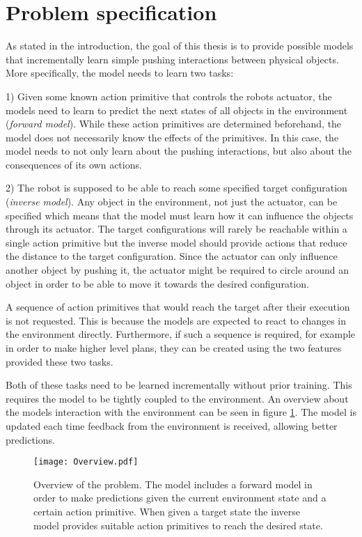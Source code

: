 \section{Problem specification \label{sec:problem}}

As stated in the introduction, the goal of this thesis is to provide possible models that incrementally learn simple pushing interactions between physical objects. 
More specifically, the model needs to learn two tasks:

1) Given some known action primitive that controls the robots actuator, the models need to learn to predict the next states of all objects in the environment (\textit{forward model}). 
While these action primitives are determined beforehand, the model does not necessarily know the effects of the primitives. In this case, the model needs to not only learn about the pushing interactions, but also about the consequences of its own actions.

2) The robot is supposed to be able to reach some specified target configuration (\textit{inverse model}). Any object in the environment, not just the actuator, can be specified which means that the model must learn how it can influence the objects through its actuator. The target configurations will rarely be reachable within a single action primitive but the inverse model should provide actions that reduce the distance to the target configuration. 
Since the actuator can only influence another object by pushing it, the actuator might be required to circle around an object in order to be able to move it towards the desired configuration.

A sequence of action primitives that would reach the target after their execution is not requested. This is because the models are expected to react to changes in the environment directly. Furthermore, if such a sequence is required, for example in order to make higher level plans, they can be created using the two features provided these two tasks.

Both of these tasks need to be learned incrementally without prior training. This requires the model to be tightly coupled to the environment. An overview about the models interaction with the environment can be seen in figure \ref{fig:overview}. The model is updated each time feedback from the environment is received, allowing better predictions.

\begin{figure}
	\centering
	\texttt{[image: Overview.pdf]}
	\caption{Overview of the problem. The model includes a forward model in order to make predictions given the current environment state and a certain action primitive. When given a target state the inverse model provides suitable action primitives to reach the desired state.}
	\label{fig:overview}
\end{figure}

